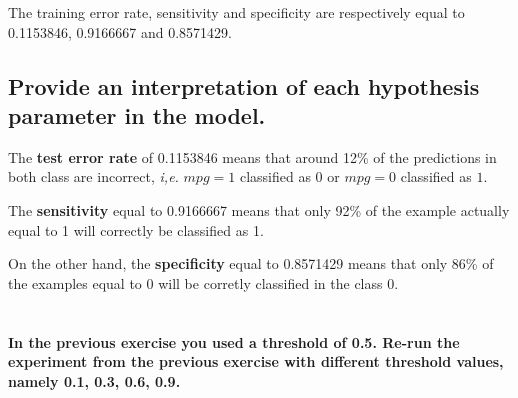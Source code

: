 \documentclass[
  12pt,
  oneside]{report}
\begin{document}
The training error rate, sensitivity and specificity are respectively equal to 0.1153846, 0.9166667 and 0.8571429.

\hypertarget{provide-an-interpretation-of-each-hypothesis-parameter-in-the-model.}{%
\subsection{Provide an interpretation of each hypothesis parameter in the model.}\label{provide-an-interpretation-of-each-hypothesis-parameter-in-the-model.}}

The \textbf{test error rate} of 0.1153846 means that around 12\% of the predictions in both class are incorrect, \emph{i,e.} \(mpg = 1\) classified as \(0\) or \(mpg = 0\) classified as \(1\).

The \textbf{sensitivity} equal to 0.9166667 means that only 92\% of the example actually equal to 1 will correctly be classified as 1.

On the other hand, the \textbf{specificity} equal to 0.8571429 means that only 86\% of the examples equal to 0 will be corretly classified in the class 0.

\hypertarget{section-6}{%
\section{}\label{section-6}}

\textbf{In the previous exercise you used a threshold of 0.5. Re-run the experiment from the previous exercise with different threshold values, namely 0.1, 0.3, 0.6, 0.9.}
\end{document}

